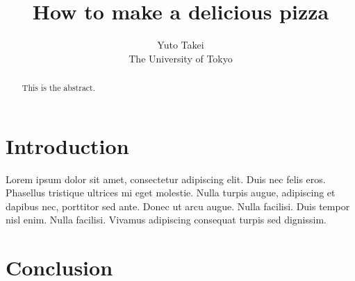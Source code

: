 \documentclass[a4paper,12pt]{article}
\title{How to make a delicious pizza}
\author{Yuto Takei \\ The University of Tokyo}
\begin{document}
\maketitle

\begin{abstract}
  This is the abstract.
\end{abstract}

\section{Introduction}

Lorem ipsum dolor sit amet, consectetur adipiscing elit. Duis nec felis eros. Phasellus tristique ultrices mi eget molestie. Nulla turpis augue, adipiscing et dapibus nec, porttitor sed ante. Donec ut arcu augue. Nulla facilisi. Duis tempor nisl enim. Nulla facilisi. Vivamus adipiscing consequat turpis sed dignissim.

\section{Conclusion}



\end{document}
